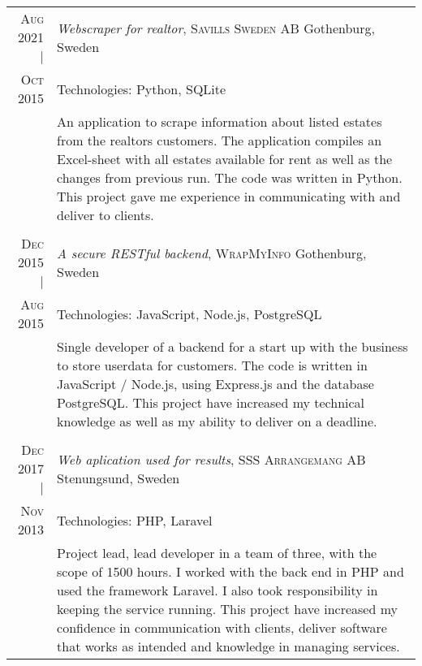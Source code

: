 \documentclass[a4paper,10pt]{scrartcl} %
\begin{document}
\begin{tabular}{r|p{15cm}}

\textsc{Aug 2021} |                 & \emph{Webscraper for realtor}, \textsc{Savills Sweden AB} \hfill Gothenburg, Sweden \\
\textsc{Oct 2015}                   & \footnotesize{Technologies: Python, SQLite} \\
\phantom{abcdefghijklm}             & \footnotesize{
An application to scrape information about listed estates from the realtors customers. The application compiles an Excel-sheet with all estates available for rent as well as the changes from previous run. The code was written in Python. This project gave me experience in communicating with and deliver to clients.} \\
\multicolumn{2}{c}{} \\


\textsc{Dec 2015} |	                & \emph{A secure RESTful backend}, \textsc{WrapMyInfo} \hfill Gothenburg, Sweden \\
\textsc{Aug 2015} 	                & \footnotesize{Technologies: JavaScript, Node.js, PostgreSQL} \\
				                    & \footnotesize{
Single developer of a backend for a start up with the business to store userdata for customers. The code is written in JavaScript / Node.js, using Express.js and the database PostgreSQL. This project have increased my technical knowledge as well as my ability to deliver on a deadline.}\\
\multicolumn{2}{c}{} \\


\textsc{Dec 2017} |                 & \emph{Web aplication used for results}, \textsc{SSS Arrangemang AB} \hfill Stenungsund, Sweden \\
\textsc{Nov 2013} 	                & \footnotesize{Technologies: PHP, Laravel} \\
					                & \footnotesize{
Project lead, lead developer in a team of three, with the scope of 1500 hours. I worked with the back end in PHP and used the framework Laravel. I also took responsibility in keeping the service running. This project have increased my confidence in communication with clients, deliver software that works as intended and knowledge in managing services.}\\

\end{tabular}
\end{document}

